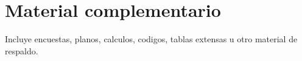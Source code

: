 \chapter{Material complementario}

Incluye encuestas, planos, calculos, codigos, tablas extensas u otro material de respaldo.
